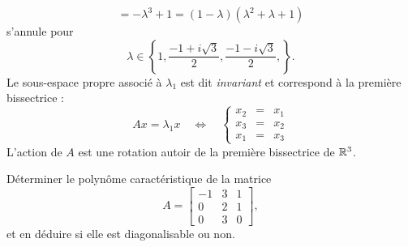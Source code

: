 \begin{enumerate}
$$ = -\lambda^3 + 1 = (1- \lambda)(\lambda^2 + \lambda + 1)
 $$
 s'annule pour 
 $$
 \lambda \in \left\{1, \frac{-1+i\sqrt{3}}{2}, \frac{-1-i\sqrt{3}}{2}, \right\}.
 $$
 Le sous-espace propre associé à $\lambda_1$ est dit {\em invariant} et correspond à la première bissectrice : 
 $$
 A x = \lambda_1 x \quad \Leftrightarrow \quad 
 \left\{\begin{array}{rcl} x_2 & = & x_1 \\ x_3 & = & x_2 \\ x_1 & = & x_3 \end{array} \right.
 $$
 L'action de $A$ est une rotation autoir de la première bissectrice de $\mathbb{R}^3$.
\end{enumerate}


\begin{exercise*}
  Déterminer le polynôme caractéristique de la matrice
  $$
  A = \left[\begin{array}{rrr}
  -1 & 3 & 1 \\ 0 & 2 & 1 \\ 0 & 3 & 0
  \end{array}\right], 
  $$
  et en déduire si elle est diagonalisable ou non.
\end{exercise*}


